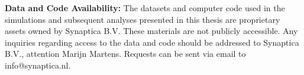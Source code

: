 \noindent \textbf{Data and Code Availability:} The datasets and computer code used in the simulations
and subsequent analyses presented in this thesis are proprietary assets owned by Synaptica B.V.
These materials are not publicly accessible. Any inquiries regarding access to the data and code
should be addressed to Synaptica B.V., attention Marijn Martens. Requests can be sent via email to info@synaptica.nl.
